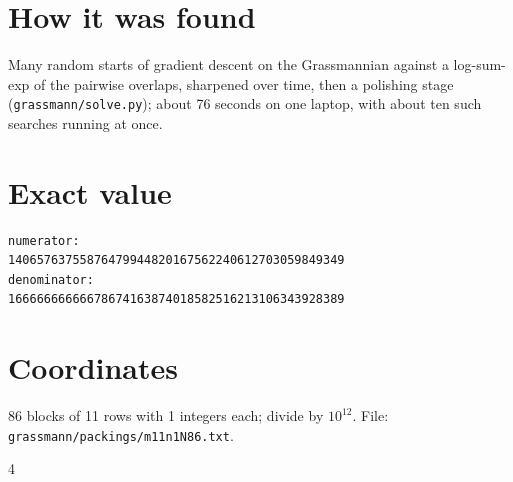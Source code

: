 \documentclass[11pt,a4paper]{article}
\begin{document}
\section{How it was found}
Many random starts of gradient descent on the Grassmannian against a log-sum-exp of the pairwise overlaps, sharpened over time, then a polishing stage (\texttt{grassmann/solve.py}); about 76 seconds on one laptop, with about ten such searches running at once.


\appendix
\section{Exact value}
{\small
\begin{verbatim}
numerator:
14065763755876479944820167562240612703059849349
denominator:
16666666666678674163874018582516213106343928389
\end{verbatim}}

\section{Coordinates}
86 blocks of 11 rows with 1 integers each; divide by $10^{12}$. File: \texttt{grassmann/packings/m11n1N86.txt}.
{\tiny
\begin{multicols}{4}
\end{multicols}}
\end{document}
